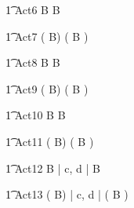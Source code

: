 \begin{circusaction}
        \t1 Act6 \circdef  {} \rcirctime \circstartby B  \intchoice {} \rcirctime \circstartby B\\
\end{circusaction}

\begin{circusaction}
        \t1 Act7 \circdef (  \rcirctime \circstartby B)  \intchoice (  \rcirctime \circstartby B )\\
\end{circusaction}

\begin{circusaction}
        \t1 Act8 \circdef  {} \rcirctime \circstartby B  \interleave {} \rcirctime \circstartby B\\
\end{circusaction}

\begin{circusaction}
        \t1 Act9 \circdef (  \rcirctime \circstartby B)  \interleave (  \rcirctime \circstartby B )\\
\end{circusaction}

\begin{circusaction}
        \t1 Act10 \circdef  {} \rcirctime \circstartby B  \circinterrupt {} \rcirctime \circstartby B\\
\end{circusaction}

\begin{circusaction}
        \t1 Act11 \circdef (  \rcirctime \circstartby B)  \circinterrupt (  \rcirctime \circstartby B )\\
\end{circusaction}


\begin{circusaction}
        \t1 Act12 \circdef  {} \rcirctime \circstartby B  \lpar | \lchanset c, d \rchanset | \rpar {} \rcirctime \circstartby B\\
\end{circusaction}

\begin{circusaction}
        \t1 Act13 \circdef (  \rcirctime \circstartby B)  \lpar | \lchanset c, d \rchanset | \rpar (  \rcirctime \circstartby B )\\
\end{circusaction}

